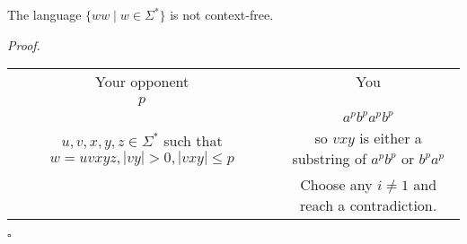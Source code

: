 \documentclass[a4paper]{article}
\newenvironment{proof}{\begin{breakbox}\textit{Proof.}}{\hfill$\square$\end{breakbox}}
\begin{document}
\begin{claim}
    The language $\{ww \mid w \in \Sigma^*\}$ is not context-free.
\end{claim}

\begin{proof}
 \begin{tabular}{|c|c|}
    Your opponent & You \\
    $p$ &  \\
     & $a^pb^pa^pb^p$ \\
    $u, v, x, y, z \in \Sigma^*$ such that $w = uvxyz, |vy| > 0, |vxy| \le p$ & so $vxy$ is either a substring of $a^pb^p$ or $b^pa^p$ \\
     & Choose any $i \ne 1$ and reach a contradiction. \\
\end{tabular}
   
\end{proof}
\end{document}
